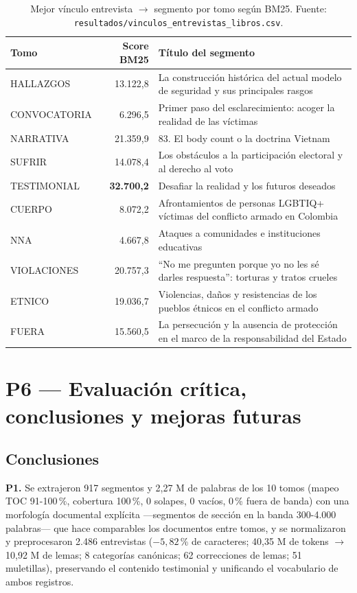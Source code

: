 \documentclass[11pt]{tg_usta}
\begin{document}
\begin{table}[htbp]
    \centering
    \caption{Mejor vínculo entrevista $\rightarrow$ segmento por tomo según BM25. Fuente: \texttt{resultados/vinculos\_entrevistas\_libros.csv}.}
    \small
    \setlength{\tabcolsep}{5pt}
    \begin{tabular}{l r p{8.4cm}}
    \toprule
    Tomo & Score BM25 & Título del segmento \\
    \midrule
    HALLAZGOS & 13.122,8 & La construcción histórica del actual modelo de seguridad y sus principales rasgos \\
    CONVOCATORIA & 6.296,5 & Primer paso del esclarecimiento: acoger la realidad de las víctimas \\
    NARRATIVA & 21.359,9 & 83. El body count o la doctrina Vietnam \\
    SUFRIR & 14.078,4 & Los obstáculos a la participación electoral y al derecho al voto \\
    TESTIMONIAL & \textbf{32.700,2} & Desafiar la realidad y los futuros deseados \\
    CUERPO & 8.072,2 & Afrontamientos de personas LGBTIQ+ víctimas del conflicto armado en Colombia \\
    NNA & 4.667,8 & Ataques a comunidades e instituciones educativas \\
    VIOLACIONES & 20.757,3 & ``No me pregunten porque yo no les sé darles respuesta'': torturas y tratos crueles \\
    ETNICO & 19.036,7 & Violencias, daños y resistencias de los pueblos étnicos en el conflicto armado \\
    FUERA & 15.560,5 & La persecución y la ausencia de protección en el marco de la responsabilidad del Estado \\
    \bottomrule
    \end{tabular}
    \label{tab:vinculos}
\end{table}


\section{P6 --- Evaluación crítica, conclusiones y mejoras futuras}\label{sec:p6}

\subsection{Conclusiones}

\textbf{P1.} Se extrajeron 917 segmentos y 2,27 M de palabras de los 10 tomos (mapeo TOC 91-100\,\%, cobertura 100\,\%, 0 solapes, 0 vacíos, 0\,\% fuera de banda) con una morfología documental explícita ---segmentos de sección en la banda 300-4.000 palabras--- que hace comparables los documentos entre tomos, y se normalizaron y preprocesaron 2.486 entrevistas ($-5{,}82$\,\% de caracteres; 40,35 M de tokens $\rightarrow$ 10,92 M de lemas; 8 categorías canónicas; 62 correcciones de lemas; 51 muletillas), preservando el contenido testimonial y unificando el vocabulario de ambos registros.
\end{document}
